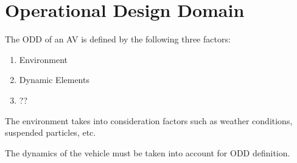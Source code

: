 \chapter{Operational Design Domain}

The ODD of an AV is defined by the following three factors:
\begin{enumerate}
  \item Environment
  \item Dynamic Elements
  \item ??
\end{enumerate}

The environment takes into consideration factors such as weather conditions, suspended particles, etc.

The dynamics of the vehicle must be taken into account for ODD definition.